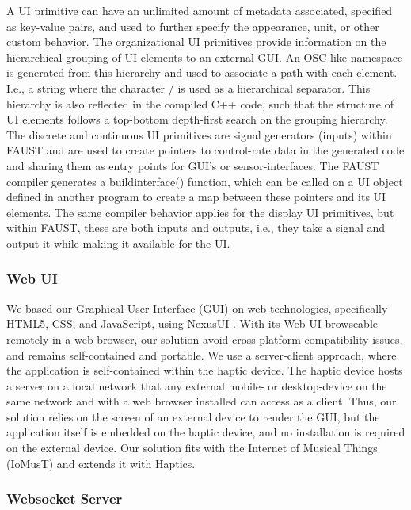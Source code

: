 \documentclass[sigconf]{nimeart}
\begin{document}
A UI primitive can have an unlimited amount of metadata associated, specified as key-value pairs, and used to further specify the appearance, unit, or other custom behavior. The organizational UI primitives provide information on the hierarchical grouping of UI elements to an external GUI. An OSC-like namespace is generated from this hierarchy and used to associate a path with each element. I.e., a string where the character / is used as a hierarchical separator. This hierarchy is also reflected in the compiled C++ code, such that the structure of UI elements follows a top-bottom depth-first search on the grouping hierarchy. The discrete and continuous UI primitives are signal generators (inputs) within FAUST and are used to create pointers to control-rate data in the generated code and sharing them as entry points for GUI's or sensor-interfaces. The FAUST compiler generates a buildinterface() function, which can be called on a UI object defined in another program to create a map between these pointers and its UI elements. The same compiler behavior applies for the display UI primitives, but within FAUST, these are both inputs and outputs, i.e., they take a signal and output it while making it available for the UI.

\subsubsection{Web UI}\label{web-ui}

We based our Graphical User Interface (GUI) on web technologies, specifically HTML5, CSS, and JavaScript, using NexusUI \cite{NexusUI}. With its Web UI browseable remotely in a web browser, our solution avoid cross platform compatibility issues, and remains self-contained and portable. We use a server-client approach, where the application is self-contained within the haptic device. The haptic device hosts a server on a local network that any external mobile- or desktop-device on the same network and with a web browser installed can access as a client. Thus, our solution relies on the screen of an external device to render the GUI, but the application itself is embedded on the haptic device, and no installation is required on the external device. Our solution fits with the Internet of Musical Things (IoMusT) \cite{Turchet2018Internet} and extends it with Haptics.

\subsubsection{Websocket Server}\label{websocket-server}
\end{document}
